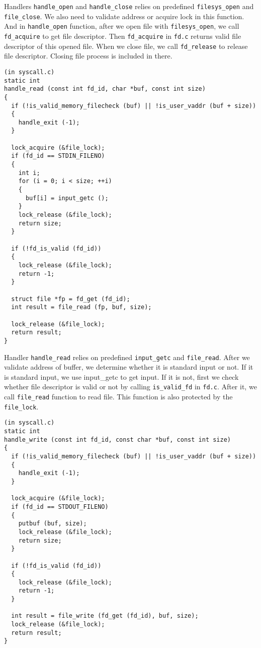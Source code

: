\documentclass[a4paper,article,11pt,oneside]{article}
\begin{document}
Handlers \texttt{handle\_open} and \texttt{handle\_close} relies on
predefined \texttt{filesys\_open} and \texttt{file\_close}. We also need to validate address or acquire lock in this function. And in \texttt{handle\_open} function, after we open file with \texttt{filesys\_open}, we call \texttt{fd\_acquire} to get file descriptor. Then \texttt{fd\_acquire} in \texttt{fd.c} returns valid file descriptor of this opened file. When we close file, we call \texttt{fd\_release} to release file descriptor. Closing file process is included in there.

\begin{verbatim}
(in syscall.c)
static int 
handle_read (const int fd_id, char *buf, const int size) 
{
  if (!is_valid_memory_filecheck (buf) || !is_user_vaddr (buf + size))
  {
    handle_exit (-1);
  }

  lock_acquire (&file_lock);
  if (fd_id == STDIN_FILENO)
  {
    int i;
    for (i = 0; i < size; ++i)
    {
      buf[i] = input_getc ();
    }
    lock_release (&file_lock);
    return size;
  }

  if (!fd_is_valid (fd_id))
  {
    lock_release (&file_lock);
    return -1;
  }

  struct file *fp = fd_get (fd_id);
  int result = file_read (fp, buf, size);

  lock_release (&file_lock);
  return result;
}
\end{verbatim}

Handler \texttt{handle\_read} relies on predefined
\texttt{input\_getc} and \texttt{file\_read}. After we validate
address of buffer, we determine whether it is standard input or
not. If it is standard input, we use input\_getc to get input. If it
is not, first we check whether file descriptor is valid or not by
calling  \texttt{is\_valid\_fd} in  \texttt{fd.c}. After it, we call
\texttt{file\_read} function to read file. This function is also
protected by the \texttt{file\_lock}.

\begin{verbatim}
(in syscall.c)
static int 
handle_write (const int fd_id, const char *buf, const int size)
{
  if (!is_valid_memory_filecheck (buf) || !is_user_vaddr (buf + size))
  {
    handle_exit (-1);
  }

  lock_acquire (&file_lock);
  if (fd_id == STDOUT_FILENO)
  {
    putbuf (buf, size);
    lock_release (&file_lock);
    return size;
  }
  
  if (!fd_is_valid (fd_id))
  {
    lock_release (&file_lock);
    return -1;
  }

  int result = file_write (fd_get (fd_id), buf, size);
  lock_release (&file_lock);
  return result;
}
\end{verbatim}
\end{document}
